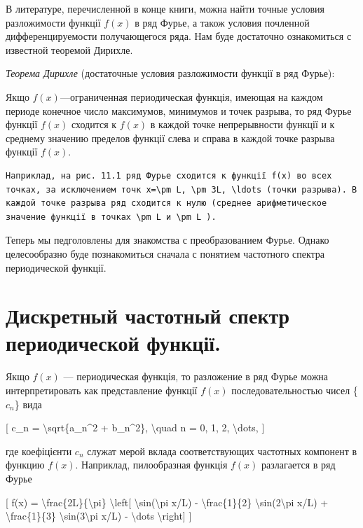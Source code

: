 \documentclass[
]{article}
\begin{document}
В литературе, перечисленной в конце книги, можна найти точные условия
разложимости функції \(f(x)\) в ряд Фурье, а також условия почленной
дифференцируемости получающегося ряда. Нам буде достаточно ознакомиться
с известной теоремой Дирихле.

\emph{Теорема Дирихле} (достаточные условия разложимости функції в ряд
Фурье):

Якщо \(f(x)\)---ограниченная периодическая функція, имеющая на каждом
периоде конечное число максимумов, минимумов и точек разрыва, то ряд
Фурье функції \(f(x)\) сходится к \(f(x)\) в каждой точке непрерывности
функції и к среднему значению пределов функції слева и справа в каждой
точке разрыва функції \(f(x)\).

\begin{verbatim}
Наприклад, на рис. 11.1 ряд Фурье сходится к функції f(x) во всех точках, за исключением точк x=\pm L, \pm 3L, \ldots (точки разрыва). В каждой точке разрыва ряд сходится к нулю (среднее арифметическое значение функції в точках \pm L и \pm L ).
\end{verbatim}

Теперь мы педголовлены для знакомства с преобразованием Фурье. Однако
целесообразно буде познакомиться сначала с понятием частотного спектра
периодической функції.

\section{Дискретный частотный спектр периодической
функції.}\label{ux434ux438ux441ux43aux440ux435ux442ux43dux44bux439-ux447ux430ux441ux442ux43eux442ux43dux44bux439-ux441ux43fux435ux43aux442ux440-ux43fux435ux440ux438ux43eux434ux438ux447ux435ux441ux43aux43eux439-ux444ux443ux43dux43aux446ux456ux457.}

Якщо \(f(x)\) --- периодическая функція, то разложение в ряд Фурье можна
интерпретировать как представление функції \(f(x)\) последовательностью
чисел \{\(c_n\)\} вида

{[} c\_n = \textbackslash sqrt\{a\_n\^{}2 + b\_n\^{}2\},
\textbackslash quad n = 0, 1, 2, \textbackslash dots, {]}

где коефіцієнти \(c_n\) служат мерой вклада соответствующих частотных
компонент в функцию \(f(x)\). Наприклад, пилообразная функція \(f(x)\)
разлагается в ряд Фурье

{[} f(x) = \textbackslash frac\{2L\}\{\textbackslash pi\}
\textbackslash left{[} \textbackslash sin(\textbackslash pi x/L) -
\textbackslash frac\{1\}\{2\} \textbackslash sin(2\textbackslash pi x/L)
+ \textbackslash frac\{1\}\{3\} \textbackslash sin(3\textbackslash pi
x/L) - \textbackslash dots \textbackslash right{]} {]}
\end{document}
